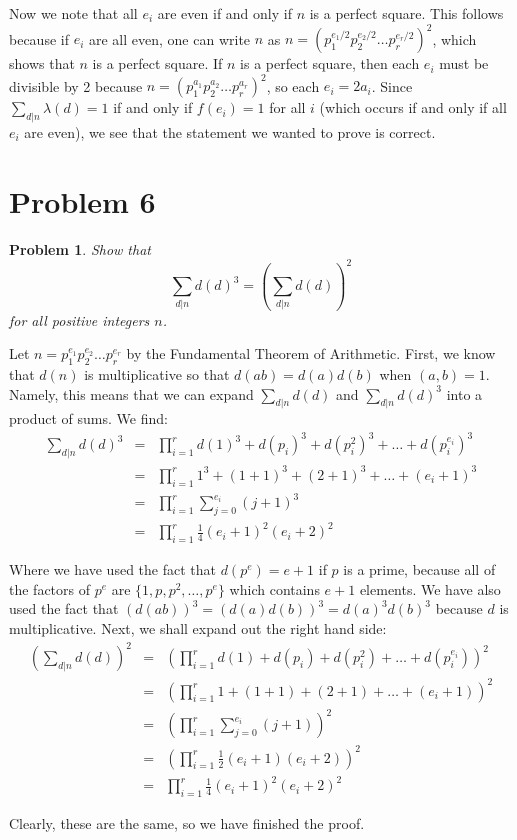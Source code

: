 \documentclass[psamsfonts]{amsart}
\newtheorem{prob}{Problem}[section]
\newenvironment{sol}{{\bfseries Solution}}{\qedsymbol}
\theoremstyle{definition}
\theoremstyle{remark}
\numberwithin{equation}{section}
\begin{document}
\begin{sol}
Now we note that all $e_i$ are even if and only if $n$ is a perfect square. This follows because if $e_i$ are all even, one can write $n$ as $n = (p_1^{e_1/2} p_2 ^{e_2 / 2} \ldots p_r^{e_r / 2})^2$, which shows that $n$ is a perfect square. If $n$ is a perfect square, then each $e_i$ must be divisible by 2 because $n = (p_1^{a_1} p_2^{a_2} \ldots p_r^{a_r})^2$, so each $e_i = 2 a_i$. Since $\sum_{d|n} \lambda(d) = 1$ if and only if $f(e_i) = 1$ for all $i$ (which occurs if and only if all $e_i$ are even), we see that the statement we wanted to prove is correct. 
\end{sol}

\section{Problem 6}

\begin{prob}
Show that 
\begin{equation}
\sum_{d|n} d(d)^3 = \left( \sum_{d|n} d(d) \right)^2
\end{equation}
for all positive integers $n$. 
\end{prob}

\begin{sol}
Let $n = p_1^{e_1} p_2^{e_2} \ldots p_r^{e_r}$ by the Fundamental Theorem of Arithmetic. First, we know that $d(n)$ is multiplicative so that $d(ab) = d(a) d(b)$ when $(a,b) = 1$. Namely, this means that we can expand $\sum_{d|n} d(d)$ and $\sum_{d|n} d(d)^3$ into a product of sums. We find:
\begin{eqnarray}
\sum_{d|n} d(d)^3 &=& \prod_{i=1}^r d(1)^3 + d(p_i)^3 + d(p_i^2)^3 + \ldots + d(p_i^{e_i})^3 \\
&=& \prod_{i=1}^r 1^3 + (1+ 1)^3 + (2 + 1)^3 + \ldots + (e_i + 1)^3 \\
&=& \prod_{i=1}^r \sum_{j=0}^{e_i} (j + 1)^3 \\
&=& \prod_{i=1}^r \frac{1}{4} (e_i + 1)^2 (e_i + 2)^2  
\end{eqnarray}

Where we have used the fact that $d(p^e) = e+1$ if $p$ is a prime, because all of the factors of $p^e$ are $\{1, p, p^2, \ldots, p^e\}$ which contains $e+1$ elements. We have also used the fact that $(d(ab))^3 = (d(a) d(b))^3 = d(a)^3 d(b)^3$ because $d$ is multiplicative. Next, we shall expand out the right hand side:
\begin{eqnarray}
\left( \sum_{d|n} d(d) \right)^2 &=& \left( \prod_{i=1}^r d(1) + d(p_i) + d(p_i^2) + \ldots + d(p_i^{e_i}) \right)^2 \\ 
&=& \left( \prod_{i=1}^r 1 + (1 +1) + (2 + 1) + \ldots + (e_i + 1) \right)^2 \\
&=& \left( \prod_{i=1}^r \sum_{j=0}^{e_i} (j+1) \right)^2 \\
&=& \left( \prod_{i=1}^r \frac{1}{2} (e_i + 1)(e_i + 2) \right)^2 \\
&=& \prod_{i=1}^r \frac{1}{4} (e_i + 1)^2 (e_i + 2)^2 
\end{eqnarray}

Clearly, these are the same, so we have finished the proof.
\end{sol}
\end{document}
